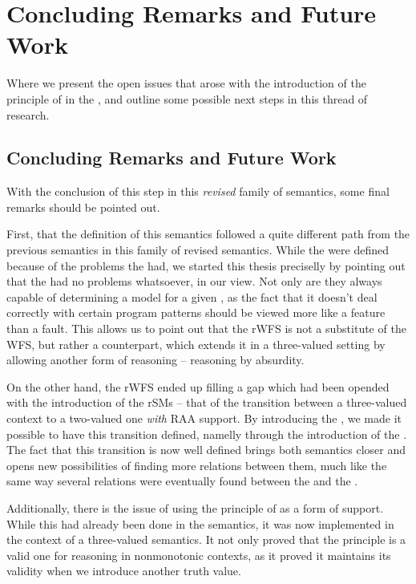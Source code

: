 \chapter{Concluding Remarks and Future Work}
\label{cha:conclusions}

\begin{ChapAbstract}
Where we present the open issues that arose with the introduction of the principle of \RAA in the \WFS, and outline some possible next steps in this thread of research.
\end{ChapAbstract}

\section{Concluding Remarks and Future Work}
With the conclusion of this step in this \emph{revised} family of semantics, some final remarks should be pointed out.

First, that the definition of this semantics followed a quite different path from the previous semantics in this family of revised semantics. While the \rsms were defined because of the problems the \sms had, we started this thesis preciselly by pointing out that the \wfs had no problems whatsoever, in our view. Not only are they always capable of determining a model for a given \nlp, as the fact that it doesn't deal correctly with certain program patterns should be viewed more like a feature than a fault. This allows us to point out that the rWFS is not a substitute of the WFS, but rather a counterpart, which extends it in a three-valued setting by allowing another form of reasoning -- reasoning by absurdity.

On the other hand, the rWFS ended up filling a gap which had been opended with the introduction of the rSMs -- that of the transition between a three-valued context to a two-valued one \emph{with} RAA support. By introducing the \rwfs, we made it possible to have this transition defined, namelly through the introduction of the \rpsms. The fact that this transition is now well defined brings both semantics closer and opens new possibilities of finding more relations between them, much like the same way several relations were eventually found between the \sms and the \wfs.

Additionally, there is the issue of using the principle of \raa as a form of support. While this had already been done in the \rsms semantics, it was now implemented in the context of a three-valued semantics. It not only proved that the principle is a valid one for reasoning in nonmonotonic contexts, as it proved it maintains its validity when we introduce another truth value.

